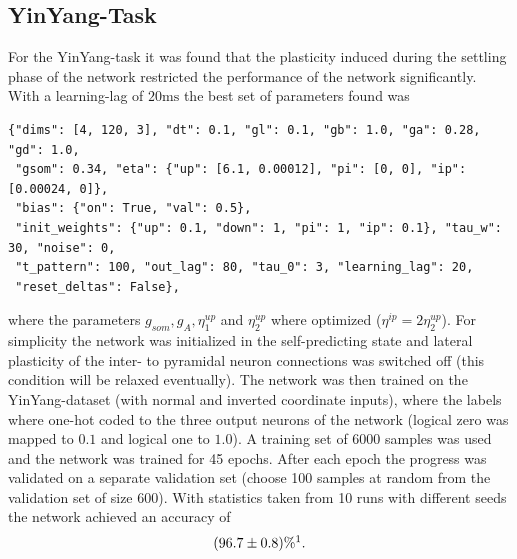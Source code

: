 \documentclass[12pt,a4paper]{article}
\begin{document}
\subsection{YinYang-Task}
For the YinYang-task it was found that the plasticity induced during the settling phase of the network restricted the performance of the network significantly. With a learning-lag of $20\text{ms}$ the best set of parameters found was 
\begin{verbatim}
{"dims": [4, 120, 3], "dt": 0.1, "gl": 0.1, "gb": 1.0, "ga": 0.28, "gd": 1.0,
 "gsom": 0.34, "eta": {"up": [6.1, 0.00012], "pi": [0, 0], "ip": [0.00024, 0]},
 "bias": {"on": True, "val": 0.5},
 "init_weights": {"up": 0.1, "down": 1, "pi": 1, "ip": 0.1}, "tau_w": 30, "noise": 0,
 "t_pattern": 100, "out_lag": 80, "tau_0": 3, "learning_lag": 20,
 "reset_deltas": False},
\end{verbatim}
where the parameters $g_{som}, g_A, \eta^{up}_1$ and $\eta^{up}_{2}$ where optimized ($\eta^{ip} = 2\eta^{up}_2$). For simplicity the network was initialized in the self-predicting state and lateral plasticity of the inter- to pyramidal neuron connections was switched off (this condition will be relaxed eventually). The network was then trained on the YinYang-dataset (with normal and inverted coordinate inputs), where the labels where one-hot coded to the three output neurons of the network (logical zero was mapped to $0.1$ and logical one to $1.0$). A training set of 6000 samples was used and the network was trained for 45 epochs. After each epoch the progress was validated on a separate validation set (choose 100 samples at random from the validation set of size 600). With statistics taken from 10 runs with different seeds the network achieved an accuracy of
\begin{align*}
(96.7 \pm 0.8)\% \protect\footnotemark.
\end{align*}
\end{document}
